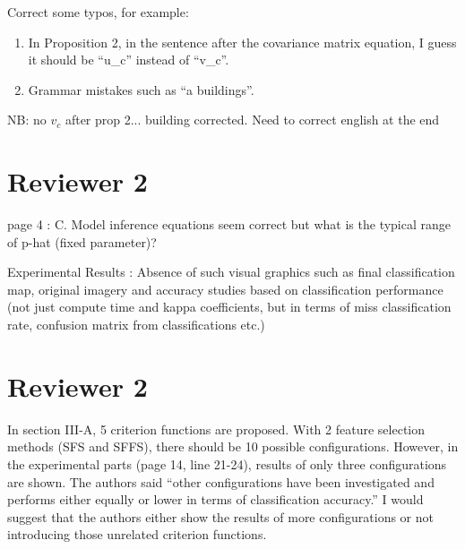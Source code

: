 \documentclass[a4paper,10pt,DIV=16]{scrartcl}
\begin{document}
\begin{revbox}
  Correct some typos, for example:
  \begin{enumerate}
    \item In Proposition 2, in the sentence after the covariance matrix equation, I guess it should be ``u\_c'' instead of ``v\_c''.
    \item Grammar mistakes such as ``a buildings''.
  \end{enumerate}
  \begin{resbox}
    NB:
    no $v_c$ after prop 2...
    building corrected. Need to correct english at the end
  \end{resbox}
\end{revbox}


\section{Reviewer 2}

\begin{revbox}
  page 4 :  C. Model inference equations seem correct  but what is the
  typical range of p-hat (fixed parameter)?
  \begin{resbox}

  \end{resbox}
\end{revbox}

\begin{revbox}
  Experimental Results : Absence of such visual graphics such as final
  classification map,  original imagery and accuracy  studies based on
  classification  performance   (not  just  compute  time   and  kappa
  coefficients, but  in terms  of miss classification  rate, confusion
  matrix from classifications etc.)

  \begin{resbox}

  \end{resbox}
\end{revbox}

\clearpage

\section{Reviewer 2}
\begin{revbox}
  In section III-A, 5 criterion functions are proposed. With 2 feature selection methods (SFS and SFFS), there should be 10 possible configurations. However, in the experimental parts (page 14, line 21-24), results of only three configurations are shown. The authors said “other configurations have been investigated and performs either equally or lower in terms of classification accuracy.” I would suggest that the authors either show the results of more configurations or not introducing those unrelated criterion functions.
  \begin{resbox}

  \end{resbox}
\end{revbox}
\end{document}
